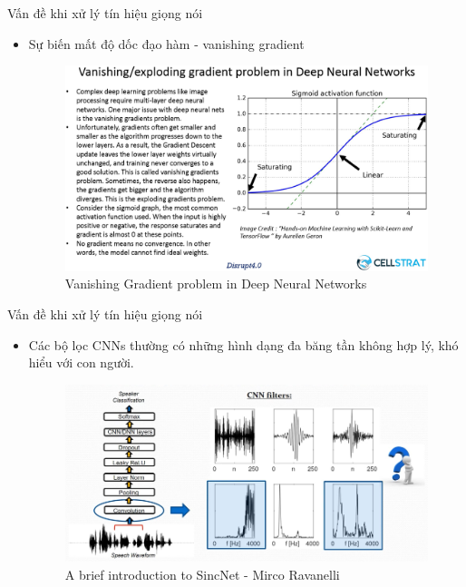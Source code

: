 \documentclass[11pt]{beamer}
\begin{document}
\begin{frame}{Vấn đề khi xử lý tín hiệu giọng nói}
	\begin{itemize}
		\item Sự biến mất độ dốc đạo hàm - vanishing gradient
		\begin{figure}[H]
			\includegraphics[width=0.75\linewidth]{images/Vanishing-Gradients-in-DNN.png}
			\caption{Vanishing Gradient problem in Deep Neural Networks}
			\label{fig:writing-thesis}
		\end{figure}
	\end{itemize}
\end{frame}
\begin{frame}{Vấn đề khi xử lý tín hiệu giọng nói}
	\begin{itemize}
		\item Các bộ lọc CNNs thường có những hình dạng đa băng tần không hợp lý, khó hiểu với con người.
		\begin{figure}[H]
			\includegraphics[width=0.9\linewidth]{images/interpretability_problems.png}
			\caption{A brief introduction to SincNet - Mirco Ravanelli}
			\label{fig:writing-thesis}
		\end{figure}
	\end{itemize}
\end{frame}
\end{document}
